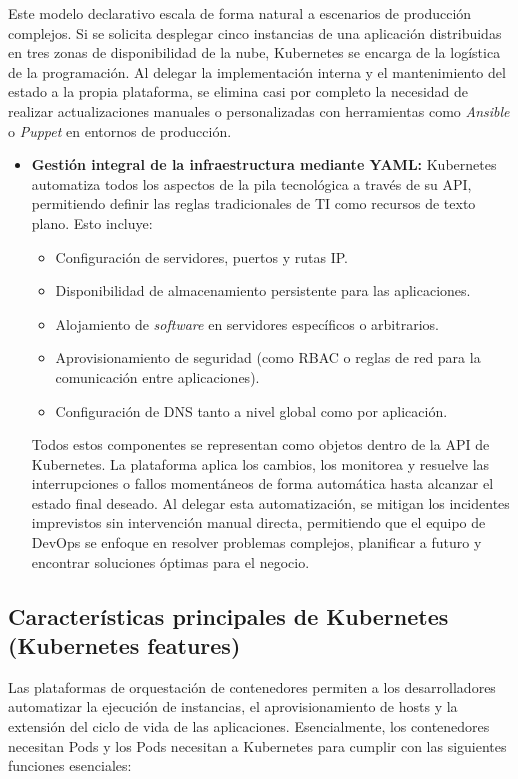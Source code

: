 Este modelo declarativo escala de forma natural a escenarios de producción complejos. Si se solicita desplegar cinco instancias de una aplicación distribuidas en tres zonas de disponibilidad de la nube, Kubernetes se encarga de la logística de la programación. Al delegar la implementación interna y el mantenimiento del estado a la propia plataforma, se elimina casi por completo la necesidad de realizar actualizaciones manuales o personalizadas con herramientas como \textit{Ansible} o \textit{Puppet} en entornos de producción.

\begin{itemize}
    \item \textbf{Gestión integral de la infraestructura mediante YAML:} Kubernetes automatiza todos los aspectos de la pila tecnológica a través de su API, permitiendo definir las reglas tradicionales de TI como recursos de texto plano. Esto incluye:
    \begin{itemize}
        \item Configuración de servidores, puertos y rutas IP.
        \item Disponibilidad de almacenamiento persistente para las aplicaciones.
        \item Alojamiento de \textit{software} en servidores específicos o arbitrarios.
        \item Aprovisionamiento de seguridad (como RBAC o reglas de red para la comunicación entre aplicaciones).
        \item Configuración de DNS tanto a nivel global como por aplicación.
    \end{itemize}
    Todos estos componentes se representan como objetos dentro de la API de Kubernetes. La plataforma aplica los cambios, los monitorea y resuelve las interrupciones o fallos momentáneos de forma automática hasta alcanzar el estado final deseado. Al delegar esta automatización, se mitigan los incidentes imprevistos sin intervención manual directa, permitiendo que el equipo de DevOps se enfoque en resolver problemas complejos, planificar a futuro y encontrar soluciones óptimas para el negocio.
\end{itemize}

\subsection{Características principales de Kubernetes (Kubernetes features)}

Las plataformas de orquestación de contenedores permiten a los desarrolladores automatizar la ejecución de instancias, el aprovisionamiento de hosts y la extensión del ciclo de vida de las aplicaciones. Esencialmente, los contenedores necesitan Pods y los Pods necesitan a Kubernetes para cumplir con las siguientes funciones esenciales:

